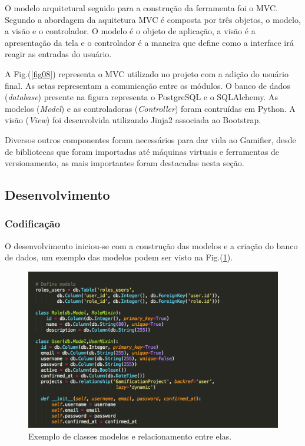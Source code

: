 O modelo arquitetural seguido para a construção da ferramenta foi o MVC. Segundo \cite{macoratti2009padroes} a abordagem da aquitetura MVC é composta por três objetos, o modelo, a visão e o controlador. O modelo é o objeto de aplicação, a visão é a apresentação da tela e o controlador é a maneira que define como a interface irá reagir as entradas do usuário.

 A  Fig.(\ref{fig08}) representa o MVC utilizado no projeto com a adição do usuário final. As setas representam a comunicação entre os módulos.\newpage
O banco de dados (\textit{database}) presente na figura representa o PostgreSQL e o SQLAlchemy. As modelos (\textit{Model}) e as controladoras (\textit{Controller}) foram contruídas em Python. A visão (\textit{View}) foi desenvolvida utilizando Jinja2 associada ao Bootstrap.

Diversos outros componentes foram necessários para dar vida ao Gamifier, desde de bibliotecas que foram importadas até máquinas virtuais e ferramentas de versionamento, as mais importantes foram destacadas nesta seção. 

\subsection {Desenvolvimento}

\subsubsection {Codificação}

O desenvolvimento iniciou-se com a construção das modelos e a criação do banco de dados, um exemplo das modelos podem ser visto na Fig.(\ref{fig09}). 


\begin{figure}[h]
	\centering
		\includegraphics[keepaspectratio=true,scale=0.8]{figuras/modelo.png}
	\caption{Exemplo de classes modelos e relacionamento entre elas.\label{fig09}}
\end{figure}


